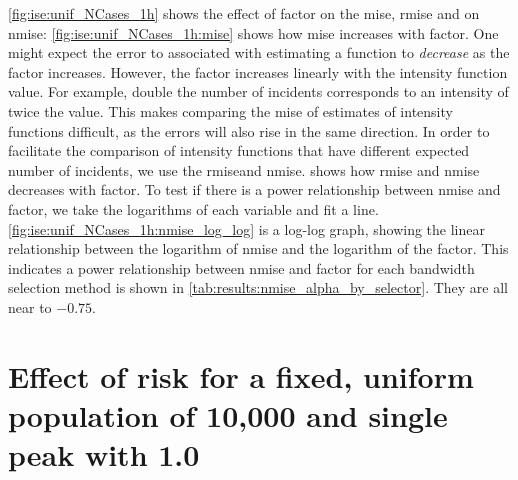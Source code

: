 \autoref{fig:ise:unif_NCases_1h} shows the effect of \gls{factor} on the \gls{mise}, \gls{rmise} and on \gls{nmise}:
\autoref{fig:ise:unif_NCases_1h:mise} shows how \gls{mise} increases with \gls{factor}.
One might expect the error to associated with estimating a function to \textit{decrease} as the \gls{factor} increases.
However, the \gls{factor} increases linearly with the intensity function value.
For example, double the number of incidents corresponds to an intensity of twice the value.
This makes comparing the \gls{mise} of estimates of intensity functions difficult,
as the errors will also rise in the same direction.
In order to facilitate the comparison of intensity functions that have different expected number of incidents,
we use the \gls{rmise}and \gls{nmise}.
 shows how \gls{rmise} and \gls{nmise} decreases with \gls{factor}.
To test if there is a power relationship between \gls{nmise} and \gls{factor},
we take the logarithms of each variable and fit a line.
\autoref{fig:ise:unif_NCases_1h:nmise_log_log} is a log-log graph,
showing the linear relationship between the logarithm of \gls{nmise} and the logarithm of the \gls{factor}.
This indicates a power relationship between \gls{nmise} and \gls{factor} for each bandwidth selection method is shown in \cref{tab:results:nmise_alpha_by_selector}.
They are all near to $-0.75$.




\section[Effect of risk spread with fixed population]
    {Effect of risk  for a fixed, uniform population of 10,000 and single peak with  1.0}
\label{sec:results:spread}

